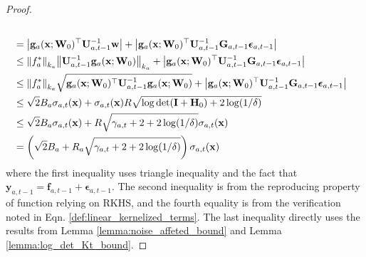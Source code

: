 \begin{proof}
\begin{align*}
        \\
        & = \left\lvert  \mathbf{g}_a(\mathbf{x}; \mathbf{W}_0)^\top \mathbf{U}^{-1}_{a,t-1} \mathbf{w}  \right\rvert  + \left\lvert \mathbf{g}_a(\mathbf{x}; \mathbf{W}_0)^\top \mathbf{U}^{-1}_{a,t-1} \mathbf{G}_{a,t-1} \boldsymbol{\epsilon}_{a, t-1}   \right\rvert 
        \\
        & \leq \norm{f_a^*}_{k_a}  \norm{   \mathbf{U}^{-1}_{a,t-1} \mathbf{g}_a(\mathbf{x}; \mathbf{W}_0)}_{k_a} + \left\lvert \mathbf{g}_a(\mathbf{x}; \mathbf{W}_0)^\top \mathbf{U}^{-1}_{a,t-1} \mathbf{G}_{a,t-1} \boldsymbol{\epsilon}_{a, t-1}   \right\rvert \\
        & \leq  \norm{f_a^*}_{k_a}  \sqrt { \mathbf{g}_a(\mathbf{x}; \mathbf{W}_0)^\top \mathbf{U}^{-1}_{a,t-1} \mathbf{g}_a(\mathbf{x}; \mathbf{W}_0)}  + \left\lvert \mathbf{g}_a(\mathbf{x}; \mathbf{W}_0)^\top \mathbf{U}^{-1}_{a,t-1} \mathbf{G}_{a,t-1} \boldsymbol{\epsilon}_{a, t-1}   \right\rvert 
        \\
        & \leq \sqrt{2}B_a \sigma_{a,t}(\mathbf{x}) + \sigma_{a,t}(\mathbf{x}) R \sqrt{\log \det (\mathbf{I} + \mathbf{H}_0) + 2 \log(1/\delta)} 
        \\
        & \le \sqrt{2}B_a \sigma_{a,t}(\mathbf{x}) +  R \sqrt{\gamma_{a,t} + 2 + 2 \log(1/\delta)} \sigma_{a,t}(\mathbf{x}) 
        \\
        & = \left(\sqrt{2}B_a + R_a \sqrt{\gamma_{a,t} + 2 + 2 \log(1/\delta)}\right)\sigma_{a,t}(\mathbf{x})
\end{align*}
where the first inequality uses triangle inequality and the fact that $\mathbf{y}_{a,t-1}= \mathbf{f}_{a, t-1} + \boldsymbol{\epsilon}_{a, t-1}$. The second inequality is from the reproducing property of function relying on RKHS, and the fourth equality is from the verification noted in Eqn.  \ref{def:linear_kernelized_terms}. The last inequality directly uses the results from Lemma \ref{lemma:noise_affeted_bound} and Lemma  \ref{lemma:log_det_Kt_bound}.


\end{proof}
